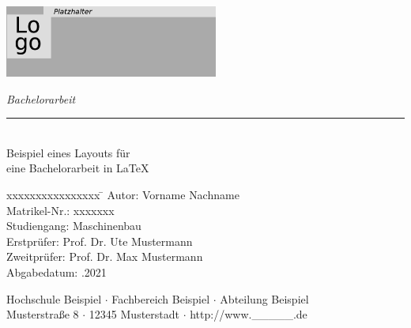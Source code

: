 \documentclass[12pt,a4paper]{scrbook}
\begin{document}
 
\begin{titlepage}
     
     \begin{flushleft} 
         \includegraphics[width=7cm]{logo.png}
     \end{flushleft} 
     
     \begin{flushright}
         \vspace{2cm}
         \LARGE \textsl{Bachelorarbeit}\\
         \rule{0.6\textwidth}{0.4pt} ~\\
         \vspace{0.5cm}
         \textsf{\LARGE Beispiel eines Layouts für}\\
         \textsf{\LARGE eine Bachelorarbeit in \LaTeX}
     \end{flushright}
     
     \vspace{3cm}
     \large
     \begin{tabbing}
         xxxxxxxxxxxxxxxx \= \kill
         Autor: \> Vorname Nachname \\
         Matrikel-Nr.: \> xxxxxxx \\
         Studiengang: \> Maschinenbau \\ [0.5cm]
         Erstprüfer: \> Prof. Dr. Ute Mustermann \\
         Zweitprüfer: \> Prof. Dr. Max Mustermann \\ [0.5cm]
         Abgabedatum: .2021 \\
     \end{tabbing}
     
     \vspace{0.5cm}
     \small
     \begin{center}
         Hochschule Beispiel $\cdot$ 
         Fachbereich Beispiel $\cdot$ 
         Abteilung Beispiel \\
         Musterstraße 8 $\cdot$ 
         12345 Musterstadt $\cdot$ 
         http://www.\_\_\_\_\_.de
     \end{center}
     
\end{titlepage}
\newpage

\end{document}
